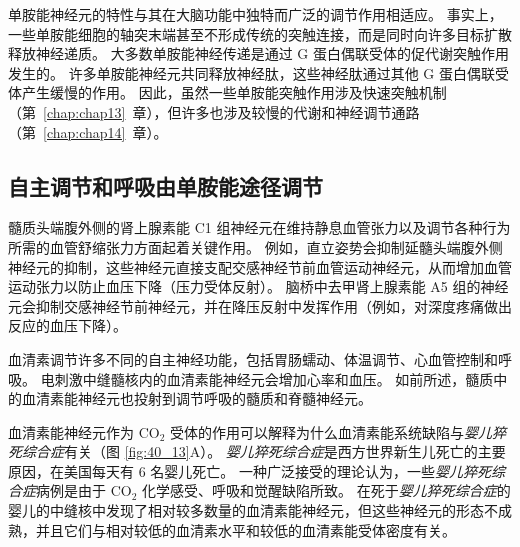 单胺能神经元的特性与其在大脑功能中独特而广泛的调节作用相适应。
事实上，一些单胺能细胞的轴突末端甚至不形成传统的突触连接，而是同时向许多目标扩散释放神经递质。
大多数单胺能神经传递是通过 G 蛋白偶联受体的促代谢突触作用发生的。
许多单胺能神经元共同释放神经肽，这些神经肽通过其他 G 蛋白偶联受体产生缓慢的作用。
因此，虽然一些单胺能突触作用涉及快速突触机制（第~\ref{chap:chap13}~章），但许多也涉及较慢的代谢和神经调节通路（第~\ref{chap:chap14}~章）。



\subsection{自主调节和呼吸由单胺能途径调节}

髓质头端腹外侧的肾上腺素能 C1 组神经元在维持静息血管张力以及调节各种行为所需的血管舒缩张力方面起着关键作用。
例如，直立姿势会抑制延髓头端腹外侧神经元的抑制，这些神经元直接支配交感神经节前血管运动神经元，从而增加血管运动张力以防止血压下降（压力受体反射）。
脑桥中去甲肾上腺素能 A5 组的神经元会抑制交感神经节前神经元，并在降压反射中发挥作用（例如，对深度疼痛做出反应的血压下降）。


血清素调节许多不同的自主神经功能，包括胃肠蠕动、体温调节、心血管控制和呼吸。
电刺激中缝髓核内的血清素能神经元会增加心率和血压。
如前所述，髓质中的血清素能神经元也投射到调节呼吸的髓质和脊髓神经元。


血清素能神经元作为 CO$_2$ 受体的作用可以解释为什么血清素能系统缺陷与\textit{婴儿猝死综合症}有关（图 \ref{fig:40_13}A）。
\textit{婴儿猝死综合症}是西方世界新生儿死亡的主要原因，在美国每天有 6 名婴儿死亡。
一种广泛接受的理论认为，一些\textit{婴儿猝死综合症}病例是由于 CO$_2$ 化学感受、呼吸和觉醒缺陷所致。
在死于\textit{婴儿猝死综合症}的婴儿的中缝核中发现了相对较多数量的血清素能神经元，但这些神经元的形态不成熟，并且它们与相对较低的血清素水平和较低的血清素能受体密度有关。



